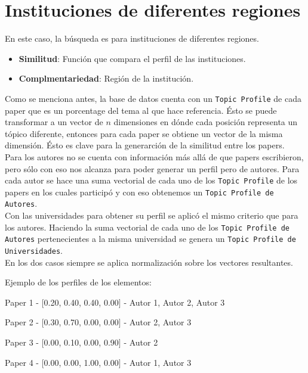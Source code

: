 \section{Instituciones de diferentes regiones}
En este caso, la búsqueda es para instituciones de diferentes regiones. 
\begin{itemize}
  \item \textbf{Similitud}: Función que compara el perfil de las instituciones.
  \item \textbf{Complmentariedad}: Región de la institución.
\end{itemize}

Como se menciona antes, la base de datos cuenta con un \texttt{Topic Profile} de cada paper que es un porcentage del tema al que hace referencia. Ésto se puede transformar a un vector de $n$ dimensiones en dónde cada posición representa un tópico diferente, entonces para cada paper se obtiene un vector de la misma dimensión. Ésto es clave para la generarción de la similitud entre los papers.\\
Para los autores no se cuenta con información más allá de que papers escribieron, pero sólo con eso nos alcanza para poder generar un perfil pero de autores. Para cada autor se hace una suma vectorial de cada uno de los \texttt{Topic Profile} de los papers en los cuales participó y con eso obtenemos un \texttt{Topic Profile de Autores}.\\
Con las universidades para obtener su perfil se aplicó el mismo criterio que para los autores. Haciendo la suma vectorial de cada uno de los \texttt{Topic Profile de Autores} pertenecientes a la misma universidad se genera un \texttt{Topic Profile de Universidades}.\\
En los dos casos siempre se aplica normalización sobre los vectores resultantes.

Ejemplo de los perfiles de los elementos:

\begin{description}
 \item[Paper - Topic Profile - Autores]
 \item Paper 1 - $[$0.20, 0.40, 0.40, 0.00$]$ - Autor 1, Autor 2, Autor 3
 \item Paper 2 - $[$0.30, 0.70, 0.00, 0.00$]$ - Autor 2, Autor 3
 \item Paper 3 - $[$0.00, 0.10, 0.00, 0.90$]$ - Autor 2
 \item Paper 4 - $[$0.00, 0.00, 1.00, 0.00$]$ - Autor 1, Autor 3
\end{description}

